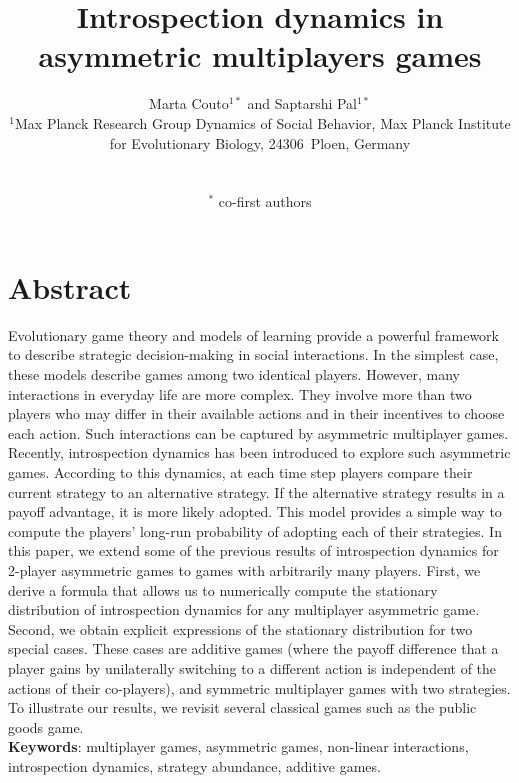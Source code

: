 \documentclass[11pt]{article}
\title{\sffamily \Large {\bfseries Introspection dynamics in asymmetric multiplayers games}}
\date{\empty}
\author{\parbox[c]{16cm}{\centering \onehalfspacing \fontsize{11}{12}\selectfont Marta Couto$^{1*}$ and Saptarshi Pal$^{1*}$\\[0.2cm]
$^1$Max Planck Research Group Dynamics of Social Behavior, Max Planck Institute for Evolutionary Biology, 24306~Ploen, Germany}\\ \\
$^*$ \fontsize{11}{12}\selectfont co-first authors}
\theoremstyle{plainCl1}
\theoremstyle{plainCl2}
\begin{document}
\maketitle
\onehalfspacing
\section*{Abstract}


Evolutionary game theory and models of learning provide a powerful framework to describe strategic decision-making in social interactions. 
In the simplest case, these models describe games among two identical players. 
However, many interactions in everyday life are more complex. 
They involve more than two players who may differ in their available actions and in their incentives to choose each action. 
Such interactions can be captured by asymmetric multiplayer games. 
Recently, introspection dynamics has been introduced to explore such asymmetric games. 
According to this dynamics, at each time step players compare their current strategy to an alternative strategy. 
If the alternative strategy results in a payoff advantage, it is more likely adopted. 
This model provides a simple way to compute the players’ long-run probability of adopting each of their strategies. 
In this paper, we extend some of the previous results of introspection dynamics for 2-player asymmetric games to games with arbitrarily many players. 
First, we derive a formula that allows us to numerically compute the stationary distribution of introspection dynamics for any multiplayer asymmetric game. 
Second, we obtain explicit expressions of the stationary distribution for two special cases. These cases are additive games (where the payoff difference that a player gains by unilaterally switching to a different action is independent of the actions of their co-players), and symmetric multiplayer games with two strategies. 
To illustrate our results, we revisit several classical games such as the public goods game.\\


\noindent \textbf{Keywords}: multiplayer games, asymmetric games, non-linear interactions, introspection dynamics, strategy abundance, additive games.
\end{document}
